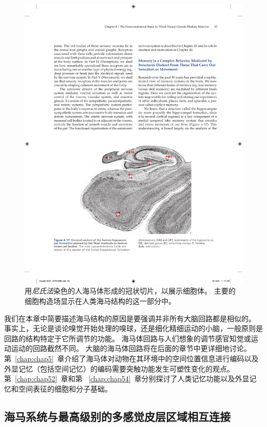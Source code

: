 \begin{figure}[htbp]
	\centering
	\includegraphics[width=1.0\linewidth]{chap04/fig_4_17}
	\caption{用\textit{尼氏法}染色的人海马体形成的冠状切片，以展示细胞体。
		主要的细胞构造场显示在人类海马结构的这一部分中。}
	\label{fig:4_17}
\end{figure}


我们在本章中简要描述海马结构的原因是要强调并非所有大脑回路都是相似的。
事实上，无论是谈论嗅觉开始处理的嗅球，还是细化精细运动的小脑，一般原则是回路的结构特定于它所调节的功能。
海马体回路与人们想象的调节感官知觉或运动运动的回路截然不同。
大脑的海马体回路将在后面的章节中更详细地讨论。 
第~\ref{chap:chap5}~章介绍了海马体对动物在其环境中的空间位置信息进行编码以及外显记忆（包括空间记忆）的编码需要突触功能发生可塑性变化的观点。 
第~\ref{chap:chap52}~章和第 ~\ref{chap:chap54}~章分别探讨了人类记忆功能以及外显记忆和空间表征的细胞和分子基础。



\subsection{海马系统与最高级别的多感觉皮层区域相互连接}

